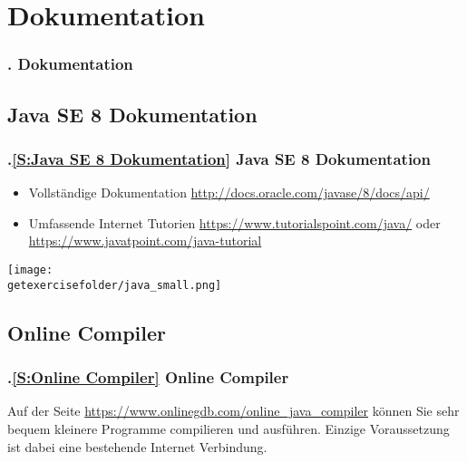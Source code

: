 \AtBeginSection{}
\section{Dokumentation}
\begin{frame}
  \frametitle{\kap. Dokumentation}%
\tableofcontents[current]
\end{frame}


\def\stitle{Java SE 8 Dokumentation}%
\subsection*{\stitle}\label{S:Java SE 8 Dokumentation}
\begin{frame}[t]%
  \frametitle{\kap.\ref{S:Java SE 8 Dokumentation} \stitle}%
\medskip

\begin{itemize}
\item Vollst\"andige Dokumentation \textcolor{KITblue}{\url{http://docs.oracle.com/javase/8/docs/api/}}
\item Umfassende Internet Tutorien \textcolor{KITblue}{\url{https://www.tutorialspoint.com/java/}} oder \textcolor{KITblue}{\url{https://www.javatpoint.com/java-tutorial}}
\end{itemize}
\medskip

\texttt{[image: \\getexercisefolder/java\_small.png]}
\end{frame}


\def\stitle{Online Compiler}%
\subsection*{\stitle}\label{S:Online Compiler}
\begin{frame}[t]%
  \frametitle{\kap.\ref{S:Online Compiler} \stitle}%
\medskip

Auf der Seite \textcolor{KITblue}{\url{https://www.onlinegdb.com/online_java_compiler}} k\"onnen Sie sehr bequem kleinere Programme compilieren und ausf\"uhren.
Einzige Voraussetzung ist dabei eine bestehende Internet Verbindung.
\end{frame}
